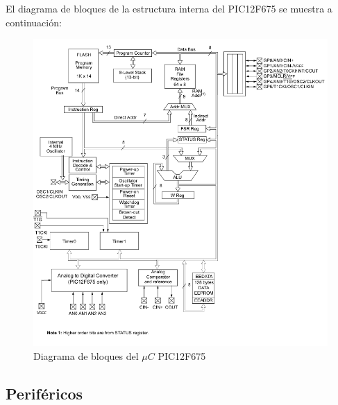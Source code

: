 El diagrama de bloques de la estructura interna del PIC12F675 se muestra a continuación:
\vfill
\begin{figure}[!h]
    \centering
    \includegraphics[width = \linewidth]{imagenes/fig2.png}
    \caption{Diagrama de bloques del $\mu C$ PIC12F675}
    \label{fig2}
\end{figure}
\vfill
\newpage
\subsection{Periféricos}


